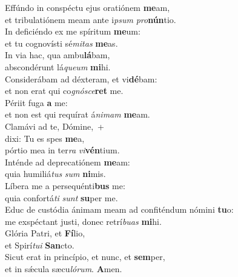 \evenverse Effúndo in conspéctu ejus oratiónem \textbf{me}am,~\*\\
\evenverse et tribulatiónem meam ante i\textit{psum} \textit{pro}\textbf{nún}tio.\\
\oddverse In deficiéndo ex me spíritum \textbf{me}um:~\*\\
\oddverse et tu cognovísti sé\textit{mi}\textit{tas} \textbf{me}as.\\
\evenverse In via hac, qua ambu\textbf{lá}bam,~\*\\
\evenverse abscondérunt lá\textit{que}\textit{um} \textbf{mi}hi.\\
\oddverse Considerábam ad déxteram, et vi\textbf{dé}bam:~\*\\
\oddverse et non erat qui co\textit{gnó}\textit{sce}\textbf{ret} me.\\
\evenverse Périit fuga \textbf{a} me:~\*\\
\evenverse et non est qui requírat á\textit{ni}\textit{mam} \textbf{me}am.\\
\oddverse Clamávi ad te, Dómine,~+\\
\oddverse  dixi: Tu es spes \textbf{me}a,~\*\\
\oddverse pórtio mea in ter\textit{ra} \textit{vi}\textbf{vén}tium.\\
\evenverse Inténde ad deprecatiónem \textbf{me}am:~\*\\
\evenverse quia humiliá\textit{tus} \textit{sum} \textbf{ni}mis.\\
\oddverse Líbera me a persequénti\textbf{bus} me:~\*\\
\oddverse quia confortá\textit{ti} \textit{sunt} \textbf{su}per me.\\
\evenverse Educ de custódia ánimam meam ad confiténdum nómini \textbf{tu}o:~\*\\
\evenverse me exspéctant justi, donec retrí\textit{bu}\textit{as} \textbf{mi}hi.\\
\oddverse Glória Patri, et \textbf{Fí}lio,~\*\\
\oddverse et Spirí\textit{tu}\textit{i} \textbf{San}cto.\\
\evenverse Sicut erat in princípio, et nunc, et \textbf{sem}per,~\*\\
\evenverse et in sǽcula sæcu\textit{ló}\textit{rum}. \textbf{A}men.\\
